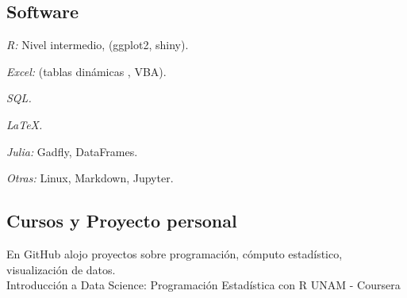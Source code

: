 \documentclass[10pt,letterpaper]{article}
\begin{document}
\subsection*{Software}
\vspace{-3mm}
\begin{itemize}
\setlength{\itemsep}{-0.8mm}
\setlength{\labelwidth}{-0.3cm}

\begin{multicols}{2}

\item \textit{R:} Nivel intermedio,  (ggplot2, shiny).
\item \textit{Excel: } (tablas dinámicas , VBA).
\item \textit{SQL.} 

\columnbreak


\item \textit{LaTeX.}
\item \textit{Julia:} Gadfly, DataFrames.
\item \textit{Otras:} Linux, Markdown, Jupyter.

\end{multicols}
\end{itemize}
\subsection*{Cursos y Proyecto personal}
\vspace{3mm}
En GitHub alojo proyectos sobre programación, cómputo estadístico, visualización de datos.\\[3pt]
 Introducción a Data Science: Programación Estadística con R \dotfill UNAM - Coursera
 
\end{document}
